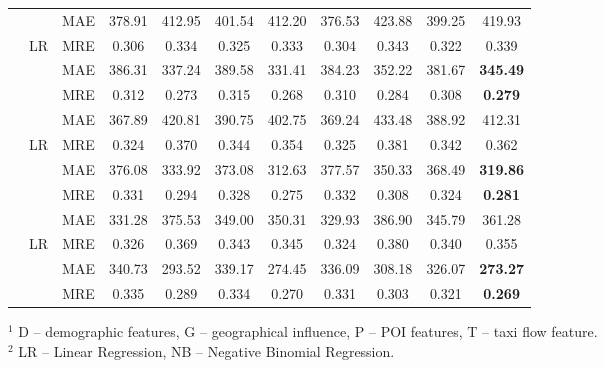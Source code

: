 \begin{table}[htb]
\begin{tabular}{|c|c|c|c|c|c|c|c|c|c|c|}
	\cellcolor{white}& \cellcolor{white} & MAE &378.91 & 412.95 & 401.54  & 412.20& 376.53 & 423.88 & 399.25 & 419.93\\ \cline{3-11}
	&	\multirow{-2}{*}{LR}& MRE& 0.306 & 0.334 & 0.325 & 0.333&  0.304 & 0.343 & 0.322 & 0.339 \\ \cline{2-11}
	\rowcolor{Gray}
	\cellcolor{white}& \cellcolor{white} & MAE & 386.31 & 337.24 & 389.58  & 331.41 & 384.23 & 352.22 & 381.67 & \textbf{345.49} \\ \cline{3-11}
	\rowcolor{Gray}
	\cellcolor{white}\multirow{-4}{*}{2012}&\cellcolor{white}\multirow{-2}{*}{NB}	& MRE& 0.312 & 0.273 & 0.315  & 0.268 & 0.310 & 0.284 & 0.308 & \textbf{0.279} \\ \hline
	

	\cellcolor{white}& \cellcolor{white} & MAE & 367.89 & 420.81 & 390.75  & 402.75 & 369.24 & 433.48 &388.92 & 412.31\\ \cline{3-11}
	&	\multirow{-2}{*}{LR}& MRE& 0.324 &  0.370 & 0.344  & 0.354  & 0.325 & 0.381 & 0.342& 0.362\\ \cline{2-11}
	\rowcolor{Gray}
	\cellcolor{white}& \cellcolor{white}& MAE & 376.08&  333.92 & 373.08 & 312.63 & 377.57 & 350.33 & 368.49 & \textbf{319.86}\\ \cline{3-11}
	\rowcolor{Gray}
	\cellcolor{white}\multirow{-4}{*}{2013}	&	\cellcolor{white}\multirow{-2}{*}{NB} & MRE& 0.331 &   0.294 & 0.328  & 0.275 & 0.332 & 0.308 & 0.324& \textbf{0.281}\\ \hline

	\cellcolor{white}& \cellcolor{white} & MAE & 331.28 & 375.53 & 349.00  & 350.31 & 329.93& 386.90& 345.79& 361.28\\ \cline{3-11}
	&	\multirow{-2}{*}{LR} & MRE& 0.326 & 0.369 & 0.343  & 0.345 & 0.324& 0.380& 0.340& 0.355\\ \cline{2-11}
	\rowcolor{Gray}
	\cellcolor{white}&\cellcolor{white}  & MAE & 340.73 & 293.52  & 339.17  & 274.45 & 336.09& 308.18& 326.07& \textbf{273.27}\\ \cline{3-11}
	\rowcolor{Gray}
	\cellcolor{white}\multirow{-4}{*}{2014}	&	\cellcolor{white}\multirow{-2}{*}{NB}& MRE& 0.335&  0.289 & 0.334 & 0.270 &  0.331 & 0.303& 0.321 & \textbf{0.269}\\ \hline
\end{tabular}

\footnotesize{$^1$ D -- demographic features, G -- geographical influence, P -- POI features, T -- taxi flow feature.\\}
\footnotesize{$^2$ LR -- Linear Regression, NB -- Negative Binomial Regression.}
\end{table}




